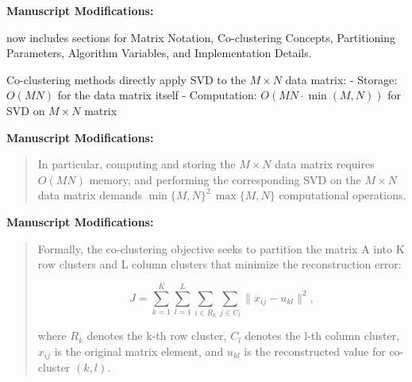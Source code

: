 \documentclass{ar2rc}
\begin{document}
\textbf{Manuscript Modifications:}

 now includes sections for Matrix Notation, Co-clustering Concepts, Partitioning Parameters, Algorithm Variables, and Implementation Details.



Co-clustering methods directly apply SVD to the $M \times N$ data matrix:
- Storage: $O(MN)$ for the data matrix itself
- Computation: $O(MN \cdot \min(M,N))$ for SVD on $M \times N$ matrix

\textbf{Manuscript Modifications:}

\begin{quote}
  In particular, computing and storing the $M \times N$ data matrix requires $O(MN)$ memory, and performing the corresponding SVD on the $M \times N$ data matrix demands $\min\{M,N\}^2\,\max\{M,N\}$ computational operations.
\end{quote}




\textbf{Manuscript Modifications:}

\begin{quote}
  Formally, the co-clustering objective seeks to partition the matrix A into K row clusters and L column clusters that minimize the reconstruction error:

  \begin{equation}
    J = \sum_{k=1}^{K} \sum_{l=1}^{L} \sum_{i \in R_k} \sum_{j \in C_l} \| x_{ij} - u_{kl} \|^2,
  \end{equation}

  where $R_k$ denotes the k-th row cluster, $C_l$ denotes the l-th column cluster, $x_{ij}$ is the original matrix element, and $u_{kl}$ is the reconstructed value for co-cluster $(k,l)$.
\end{quote}
\end{document}
